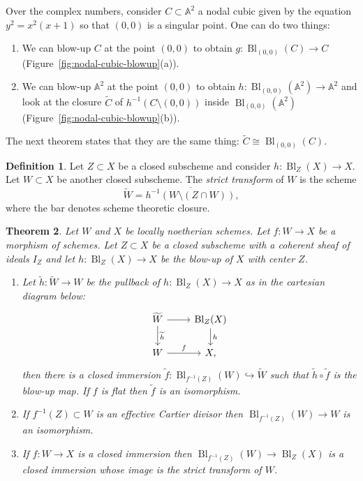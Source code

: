 \documentclass[12pt]{article}
\numberwithin{equation}{section}
\newtheorem{theorem}{Theorem}[subsection]
\theoremstyle{definition}
\newtheorem{definition}[theorem]{Definition}
\theoremstyle{remark}
\renewcommand{\AA}{\mathbb{A}}
\newcommand{\Bl}{\operatorname{Bl}}
\begin{document}
Over the complex numbers, consider $C \subset \AA^2$ a nodal cubic given by the equation $y^2=x^2(x+1)$ so that $(0,0)$ is a singular point. 
One can do two things: 
\begin{enumerate}
	\item We can blow-up $C$ at the point $(0,0)$ to obtain $g:\Bl_{(0,0)}(C) \to C$ (Figure~\ref{fig:nodal-cubic-blowup}(a)).
	\item We can blow-up $\AA^2$ at the point $(0,0)$ to obtain $h:\Bl_{(0,0)}(\AA^2)\to \AA^2$ and look at the closure $\widetilde{C}$ of $h^{-1}\left( C \setminus (0,0) \right)$ inside $\Bl_{(0,0)}(\AA^2)$ (Figure~\ref{fig:nodal-cubic-blowup}(b)).
\end{enumerate}
The next theorem states that they are the same thing: $\widetilde{C} \cong \Bl_{(0,0)}(C)$. 

\begin{definition}
	Let $Z \subset X$ be a closed subscheme and consider $h:\Bl_Z(X)\to X$.
	Let $W \subset X$ be another closed subscheme. 
	The \emph{strict transform} of $W$ is the scheme 
	 $$ \widetilde{W} = \overline{ h^{-1}(W\setminus (Z\cap W))}, $$
    where the bar denotes scheme theoretic closure. 
\end{definition}

\begin{theorem}
	Let $W$ and $X$ be locally noetherian schemes. 
	Let $f:W \to X$ be a morphism of schemes. 
	Let $Z \subset X$ be a closed subscheme with a coherent sheaf of ideals $I_Z$ and let $h: \Bl_Z(X) \to X$ be the blow-up of $X$ with center $Z$.
	\begin{enumerate}
		\item Let $\widetilde{h}:\widetilde{W} \to W$ be the pullback of $h:\Bl_Z(X)\to X$ as in the cartesian diagram below:
		 $$\begin{tikzcd}
		\widetilde{W} \ar[r] \ar[d,"\widetilde{h}"] & \Bl_Z(X) \ar[d,"h"] \\
		W \ar[r,"f"] & X,
		 \end{tikzcd}
		 $$
		then there is a closed immersion $\widetilde{f} \colon \Bl_{f^{-1}(Z)}(W) \hookrightarrow \widetilde{W}$ such that $\widetilde{h}\circ\widetilde{f}$ is the blow-up map. If $f$ is flat then $\widetilde{f}$ is an isomorphism.
		\item If $f^{-1}(Z)\subset W$ is an effective Cartier divisor then $\Bl_{f^{-1}(Z)}(W)\to W$ is an isomorphism.
		\item If $f:W \to X$ is a closed immersion then $\Bl_{f^{-1}(Z)}(W) \to \Bl_Z(X)$ is a closed immersion whose image is the strict transform of $W$.
	\end{enumerate}
\end{theorem}
\end{document}
